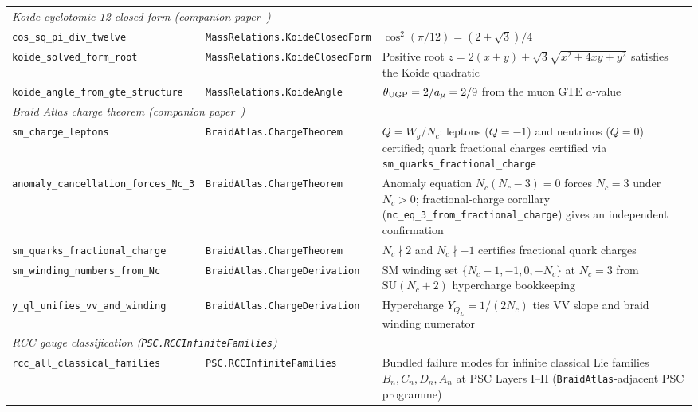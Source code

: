 \documentclass[10pt]{article}
\begin{document}
\begin{longtable}{@{} p{3.8cm} p{4.8cm} p{4.8cm} @{}}
\multicolumn{3}{l}{\textit{Koide cyclotomic-12 closed form (companion paper~\cite{Spivack2026_Koide})}} \\[2pt]
\nolinkurl{cos_sq_pi_div_twelve} & \nolinkurl{MassRelations.KoideClosedForm} & $\cos^2(\pi/12) = (2 + \sqrt{3})/4$ \\
\nolinkurl{koide_solved_form_root} & \nolinkurl{MassRelations.KoideClosedForm} & Positive root $z = 2(x+y) + \sqrt{3}\sqrt{x^2 + 4xy + y^2}$ satisfies the Koide quadratic \\
\nolinkurl{koide_angle_from_gte_structure} & \nolinkurl{MassRelations.KoideAngle} & $\theta_{\rm UGP} = 2/a_\mu = 2/9$ from the muon GTE $a$-value \\[4pt]

\multicolumn{3}{l}{\textit{Braid Atlas charge theorem (companion paper~\cite{SpivackBraidAtlas})}} \\[2pt]
\nolinkurl{sm_charge_leptons} & \nolinkurl{BraidAtlas.ChargeTheorem} & $Q = W_g / N_c$: leptons ($Q=-1$) and neutrinos ($Q=0$) certified; quark fractional charges certified via \texttt{sm\_quarks\_fractional\_charge} \\
\nolinkurl{anomaly_cancellation_forces_Nc_3} & \nolinkurl{BraidAtlas.ChargeTheorem} & Anomaly equation $N_c(N_c-3)=0$ forces $N_c=3$ under $N_c>0$; fractional-charge corollary (\texttt{nc\_eq\_3\_\allowbreak from\_fractional\_charge}) gives an independent confirmation \\
\nolinkurl{sm_quarks_fractional_charge} & \nolinkurl{BraidAtlas.ChargeTheorem} & $N_c \nmid 2$ and $N_c \nmid -1$ certifies fractional quark charges \\
\nolinkurl{sm_winding_numbers_from_Nc} & \nolinkurl{BraidAtlas.ChargeDerivation} & SM winding set $\{N_c{-}1,{-}1,0,{-}N_c\}$ at $N_c=3$ from $\mathrm{SU}(N_c{+}2)$ hypercharge bookkeeping \\
\nolinkurl{y_ql_unifies_vv_and_winding} & \nolinkurl{BraidAtlas.ChargeDerivation} & Hypercharge $Y_{Q_L} = 1/(2N_c)$ ties VV slope and braid winding numerator \\[4pt]

\multicolumn{3}{l}{\textit{RCC gauge classification (\texttt{PSC.RCCInfiniteFamilies})}} \\[4pt]
\nolinkurl{rcc_all_classical_families} & \nolinkurl{PSC.RCCInfiniteFamilies} & Bundled failure modes for infinite classical Lie families \(B_n,C_n,D_n,A_n\) at PSC Layers I--II (\texttt{BraidAtlas}-adjacent PSC programme) \\[4pt]


\end{longtable}
\end{document}
